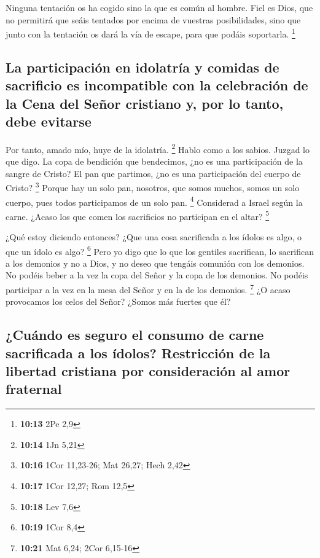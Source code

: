  Ninguna tentación os ha cogido sino la que es común al
hombre. Fiel es Dios, que no permitirá que seáis tentados por encima de
vuestras posibilidades, sino que junto con la tentación os dará la vía
de escape, para que podáis soportarla. \footnote{\textbf{10:13} 2Pe 2,9}

\hypertarget{la-participaciuxf3n-en-idolatruxeda-y-comidas-de-sacrificio-es-incompatible-con-la-celebraciuxf3n-de-la-cena-del-seuxf1or-cristiano-y-por-lo-tanto-debe-evitarse}{%
\subsection{La participación en idolatría y comidas de sacrificio es
incompatible con la celebración de la Cena del Señor cristiano y, por lo
tanto, debe
evitarse}\label{la-participaciuxf3n-en-idolatruxeda-y-comidas-de-sacrificio-es-incompatible-con-la-celebraciuxf3n-de-la-cena-del-seuxf1or-cristiano-y-por-lo-tanto-debe-evitarse}}

 Por tanto, amado mío, huye de la idolatría. \footnote{\textbf{10:14}
  1Jn 5,21}  Hablo como a los sabios. Juzgad lo que digo.
 La copa de bendición que bendecimos, ¿no es una
participación de la sangre de Cristo? El pan que partimos, ¿no es una
participación del cuerpo de Cristo? \footnote{\textbf{10:16} 1Cor
  11,23-26; Mat 26,27; Hech 2,42}  Porque hay un solo
pan, nosotros, que somos muchos, somos un solo cuerpo, pues todos
participamos de un solo pan. \footnote{\textbf{10:17} 1Cor 12,27; Rom
  12,5}  Considerad a Israel según la carne. ¿Acaso los
que comen los sacrificios no participan en el altar? \footnote{\textbf{10:18}
  Lev 7,6}

 ¿Qué estoy diciendo entonces? ¿Que una cosa sacrificada
a los ídolos es algo, o que un ídolo es algo? \footnote{\textbf{10:19}
  1Cor 8,4}  Pero yo digo que lo que los gentiles
sacrifican, lo sacrifican a los demonios y no a Dios, y no deseo que
tengáis comunión con los demonios.  No podéis beber a la
vez la copa del Señor y la copa de los demonios. No podéis participar a
la vez en la mesa del Señor y en la de los demonios. \footnote{\textbf{10:21}
  Mat 6,24; 2Cor 6,15-16}  ¿O acaso provocamos los celos
del Señor? ¿Somos más fuertes que él?

\hypertarget{cuuxe1ndo-es-seguro-el-consumo-de-carne-sacrificada-a-los-uxeddolos-restricciuxf3n-de-la-libertad-cristiana-por-consideraciuxf3n-al-amor-fraternal}{%
\subsection{¿Cuándo es seguro el consumo de carne sacrificada a los
ídolos? Restricción de la libertad cristiana por consideración al amor
fraternal}\label{cuuxe1ndo-es-seguro-el-consumo-de-carne-sacrificada-a-los-uxeddolos-restricciuxf3n-de-la-libertad-cristiana-por-consideraciuxf3n-al-amor-fraternal}}

